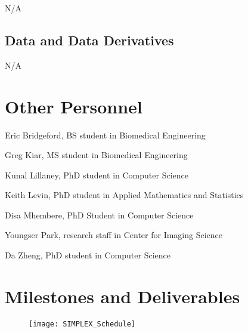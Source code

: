 \documentclass[11pt]{article}
\newcommand{\jovo}[1]{{\color{red}{\it [JV: #1]}}}
\begin{document}
N/A


\subsection{Data and Data Derivatives}


N/A

\section{Other Personnel}
\begin{compactitem}
\item Eric Bridgeford, BS student in Biomedical Engineering
\item Greg Kiar, MS student in Biomedical Engineering
\item Kunal Lillaney, PhD student in Computer Science
\item Keith Levin, PhD student in Applied Mathematics and Statistics
\item{Disa Mhembere, PhD Student in Computer Science}
\item{Youngser Park, research staff in Center for Imaging Science}
\item Da Zheng, PhD student in Computer Science
\end{compactitem}

% 
% 

\appendix
\section{Milestones and Deliverables}


\begin{figure}[b!]
\centering
\texttt{[image: SIMPLEX\_Schedule]}%
\end{figure}
\end{document}
